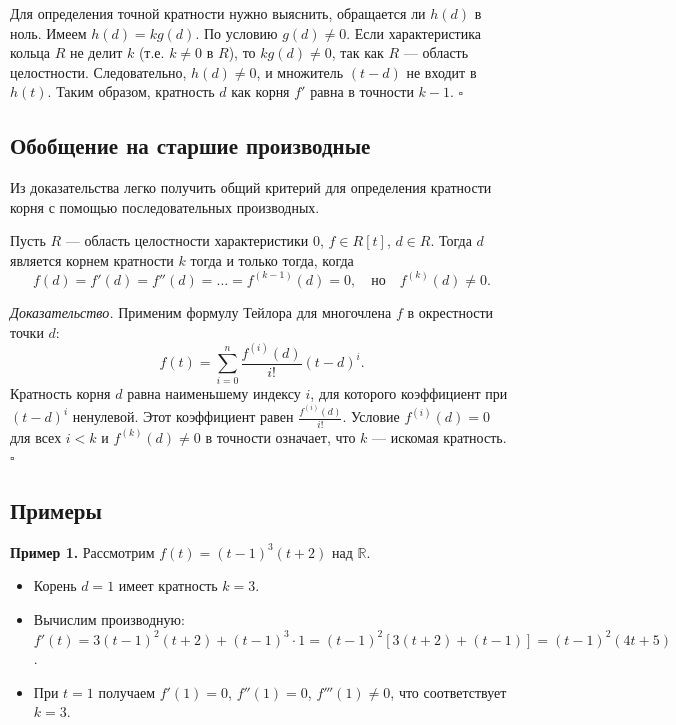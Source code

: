 \documentclass[a4paper,12pt]{article}
\theoremstyle{definition}
\theoremstyle{plain}
\theoremstyle{remark}
\begin{document}
	Для определения точной кратности нужно выяснить, обращается ли \( h(d) \) в ноль. Имеем \( h(d) = k g(d) \). По условию \( g(d) \neq 0 \). Если характеристика кольца \( R \) не делит \( k \) (т.е. \( k \neq 0 \) в \( R \)), то \( k g(d) \neq 0 \), так как \( R \) — область целостности. Следовательно, \( h(d) \neq 0 \), и множитель \( (t - d) \) не входит в \( h(t) \). Таким образом, кратность \( d \) как корня \( f' \) равна в точности \( k-1 \). \hfill \(\square\)
	
	\subsection{Обобщение на старшие производные}
	
	Из доказательства легко получить общий критерий для определения кратности корня с помощью последовательных производных.
	
	\begin{tcolorbox}[colback=yellow!5, colframe=orange!50!black, title=Следствие (Критерий в терминах производных)]
		Пусть \( R \) — область целостности характеристики 0, \( f \in R[t] \), \( d \in R \). Тогда \( d \) является корнем кратности \( k \) тогда и только тогда, когда
		\[
		f(d) = f'(d) = f''(d) = \dots = f^{(k-1)}(d) = 0, \quad \text{но} \quad f^{(k)}(d) \neq 0.
		\]
	\end{tcolorbox}
	
	\medskip
	\textit{Доказательство.}
	Применим формулу Тейлора для многочлена \( f \) в окрестности точки \( d \):
	\[
	f(t) = \sum_{i=0}^n \frac{f^{(i)}(d)}{i!} (t - d)^i.
	\]
	Кратность корня \( d \) равна наименьшему индексу \( i \), для которого коэффициент при \( (t - d)^i \) ненулевой. Этот коэффициент равен \( \frac{f^{(i)}(d)}{i!} \). Условие \( f^{(i)}(d) = 0 \) для всех \( i < k \) и \( f^{(k)}(d) \neq 0 \) в точности означает, что \( k \) — искомая кратность. \hfill \(\square\)
	
	\subsection{Примеры}
	
	\textbf{Пример 1.} Рассмотрим \( f(t) = (t-1)^3 (t+2) \) над \( \mathbb{R} \).
	\begin{itemize}
		\item Корень \( d = 1 \) имеет кратность \( k = 3 \).
		\item Вычислим производную: \( f'(t) = 3(t-1)^2(t+2) + (t-1)^3 \cdot 1 = (t-1)^2[3(t+2) + (t-1)] = (t-1)^2(4t+5) \).
		\item При \( t = 1 \) получаем \( f'(1) = 0 \), \( f''(1) = 0 \), \( f'''(1) \neq 0 \), что соответствует \( k = 3 \).
	\end{itemize}
	
\end{document}
